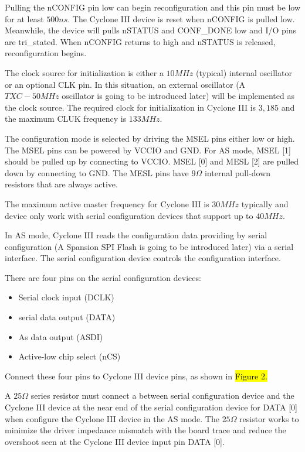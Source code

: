 Pulling the nCONFIG pin low can begin reconfiguration and this pin must be low for at least $500ns$. The Cyclone III device is reset when nCONFIG is pulled low. Meanwhile, the device will pulls nSTATUS and CONF\_DONE low and I/O pins are tri\_stated. When nCONFIG returns to high and nSTATUS is released, reconfiguration begins.

The clock source for initialization is either a $10MHz$ (typical) internal oscillator or an optional CLK pin. In this situation, an external oscillator (A $TXC-50MHz$ oscillator is going to be introduced later) will be implemented as the clock source. The required clock for initialization in Cyclone III is $3,185$ and the maximum CLUK frequency is $133MHz$.

The configuration mode is selected by driving the MSEL pins either low or high. The MSEL pins can be powered by VCCIO and GND. For AS mode, MSEL [1] should be pulled up by connecting to VCCIO. MSEL [0] and MESL [2] are pulled down by connecting to GND. The MESL pins have $9\Omega$ internal pull-down resistors that are always active.

The maximum active master frequency for Cyclone III is $30MHz$ typically and device only work with serial configuration devices that support up to $40MHz$.

In AS mode, Cyclone III reads the configuration data providing by serial configuration (A Spansion SPI Flash is going to be introduced later) via a serial interface. The serial configuration device controls the configuration interface.

There are four pins on the serial configuration devices:
\begin{itemize}
 \item Serial clock input (DCLK)
 \item serial data output (DATA)
 \item As data output (ASDI)
 \item Active-low chip select (nCS)
\end{itemize}

Connect these four pins to Cyclone III device pins, as shown in \hl{Figure 2.}


A $25\Omega$ series resistor must connect a between serial configuration device and the Cyclone III device at the near end of the serial configuration device for DATA [0] when configure the Cyclone III device in the AS mode. The $25\Omega$ resistor works to minimize the driver impedance mismatch with the board trace and reduce the overshoot seen at the Cyclone III device input pin DATA [0].

